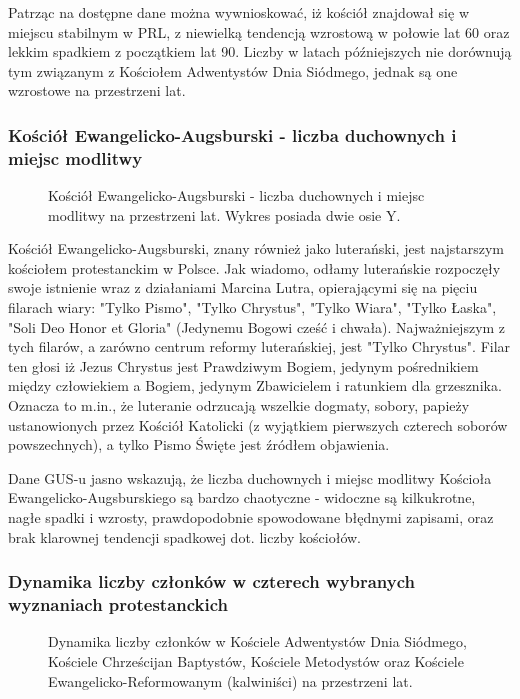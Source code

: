 \documentclass[12pt]{article}
\begin{document}
Patrząc na dostępne dane można wywnioskować, iż kościół znajdował się w miejscu stabilnym w PRL, z niewielką tendencją wzrostową w połowie lat 60 oraz lekkim spadkiem z początkiem lat 90. 
Liczby w latach późniejszych nie dorównują tym związanym z Kościołem Adwentystów Dnia Siódmego, jednak są one wzrostowe na przestrzeni lat.


\subsubsection{Kościół Ewangelicko-Augsburski - liczba duchownych i miejsc modlitwy}
\begin{figure}[H]
    
    \caption{Kościół Ewangelicko-Augsburski - liczba duchownych i miejsc modlitwy na przestrzeni lat. Wykres posiada dwie osie Y.}
\end{figure}

Kościół Ewangelicko-Augsburski, znany również jako luterański, jest najstarszym kościołem protestanckim w Polsce. Jak wiadomo, odłamy luterańskie rozpoczęły swoje istnienie wraz z działaniami Marcina Lutra, 
opierającymi się na pięciu filarach wiary: "Tylko Pismo", "Tylko Chrystus", "Tylko Wiara", "Tylko Łaska", "Soli Deo Honor et Gloria" (Jedynemu Bogowi cześć i chwała). Najważniejszym z tych filarów, 
a zarówno centrum reformy luterańskiej, jest "Tylko Chrystus". Filar ten głosi iż Jezus Chrystus jest Prawdziwym Bogiem, jedynym pośrednikiem między człowiekiem a Bogiem, jedynym Zbawicielem i ratunkiem dla 
grzesznika. Oznacza to m.in., że luteranie odrzucają wszelkie dogmaty, sobory, papieży ustanowionych przez Kościół Katolicki (z wyjątkiem pierwszych czterech soborów powszechnych), a tylko Pismo Święte jest
źródłem objawienia.

Dane GUS-u jasno wskazują, że liczba duchownych i miejsc modlitwy Kościoła Ewangelicko-Augsburskiego są bardzo chaotyczne - widoczne są kilkukrotne, nagłe spadki i wzrosty, prawdopodobnie spowodowane 
błędnymi zapisami, oraz brak klarownej tendencji spadkowej dot. liczby kościołów. 


\subsubsection{Dynamika liczby członków w czterech wybranych wyznaniach protestanckich}
\begin{figure}[H]
    
    \caption{Dynamika liczby członków w Kościele Adwentystów Dnia Siódmego, Kościele Chrześcijan Baptystów, Kościele Metodystów oraz Kościele Ewangelicko-Reformowanym (kalwiniści) na przestrzeni lat.}
\end{figure}
\end{document}
